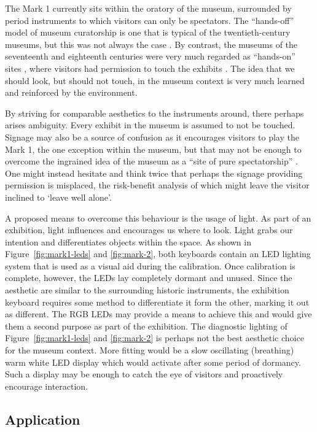 The Mark 1 currently sits within the oratory of the museum, surrounded by period
instruments to which visitors can only be spectators. The ``hands-off'' model of
museum curatorship is one that is typical of the twentieth-century museums, but
this was not always the case \cite{howes_introduction_2014}. By contrast, the
museums of the seventeenth and eighteenth centuries were very much regarded as
``hands-on'' sites \cite{howes_introduction_2014}, where visitors had permission
to touch the exhibits \cite{classen_touch_2005}. The idea that we should look,
but should not touch, in the museum context is very much learned and reinforced
by the environment.

By striving for comparable aesthetics to the instruments around, there perhaps
arises ambiguity. Every exhibit in the museum is assumed to not be touched.
Signage may also be a source of confusion \cite{khalifa_visitors_2025} as it
encourages visitors to play the Mark 1, the one exception within the museum, but
that may not be enough to overcome the ingrained idea of the museum as a ``site
of pure spectatorship'' \cite{howes_introduction_2014}. One might instead
hesitate and think twice that perhaps the signage providing permission is
misplaced, the risk-benefit analysis of which might leave the visitor inclined
to `leave well alone'.

A proposed means to overcome this behaviour is the usage of light. As part of an
exhibition, light influences and encourages us where to look. Light grabs our
intention and differentiates objects within the space. As shown in
Figure~\ref{fig:mark1-leds} and \ref{fig:mark-2}, both keyboards contain an LED
lighting system that is used as a visual aid during the calibration. Once
calibration is complete, however, the LEDs lay completely dormant and unused.
Since the aesthetic are similar to the surrounding historic instruments, the
exhibition keyboard requires some method to differentiate it form the other,
marking it out as different. The RGB LEDs may provide a means to achieve this
and would give them a second purpose as part of the exhibition. The diagnostic
lighting of Figure~\ref{fig:mark1-leds} and \ref{fig:mark-2} is perhaps not the
best aesthetic choice for the museum context. More fitting would be a slow
oscillating (breathing) warm white LED display which would activate after some
period of dormancy. Such a display may be enough to catch the eye of visitors
and proactively encourage interaction.

\subsection{Application}

